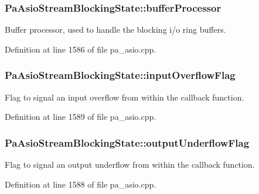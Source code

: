 \subsubsection[{\texorpdfstring{buffer\+Processor}{bufferProcessor}}]{ Pa\+Asio\+Stream\+Blocking\+State\+::buffer\+Processor}\hypertarget{struct_pa_asio_stream_blocking_state_af8989602749763446edf9eeb34975ada}{}\label{struct_pa_asio_stream_blocking_state_af8989602749763446edf9eeb34975ada}
Buffer processor, used to handle the blocking i/o ring buffers. 

Definition at line 1586 of file pa\+\_\+asio.\+cpp.

\subsubsection[{\texorpdfstring{input\+Overflow\+Flag}{inputOverflowFlag}}]{ Pa\+Asio\+Stream\+Blocking\+State\+::input\+Overflow\+Flag}\hypertarget{struct_pa_asio_stream_blocking_state_a601d69041f7e015cb337591afd59319b}{}\label{struct_pa_asio_stream_blocking_state_a601d69041f7e015cb337591afd59319b}
Flag to signal an input overflow from within the callback function. 

Definition at line 1589 of file pa\+\_\+asio.\+cpp.

\subsubsection[{\texorpdfstring{output\+Underflow\+Flag}{outputUnderflowFlag}}]{ Pa\+Asio\+Stream\+Blocking\+State\+::output\+Underflow\+Flag}\hypertarget{struct_pa_asio_stream_blocking_state_a3a15447e096a4c7d08b970351894ba3c}{}\label{struct_pa_asio_stream_blocking_state_a3a15447e096a4c7d08b970351894ba3c}
Flag to signal an output underflow from within the callback function. 

Definition at line 1588 of file pa\+\_\+asio.\+cpp.


